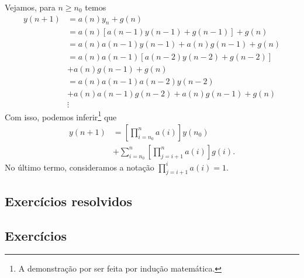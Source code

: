 Vejamos, para $n\geq n_0$ temos
\begin{align*}
  y(n+1) &= a(n)y_n + g(n) \\
         &= a(n)\left[a(n-1)y(n-1)+g(n-1)\right] + g(n) \\
         &= a(n)a(n-1)y(n-1)+a(n)g(n-1) + g(n) \\
         &= a(n)a(n-1)\left[a(n-2)y(n-2)+g(n-2)\right] \\
         &+ a(n)g(n-1) + g(n) \\
         &= a(n)a(n-1)a(n-2)y(n-2) \\
         &+ a(n)a(n-1)g(n-2) + a(n)g(n-1) + g(n) \\
         &\vdots
\end{align*}
Com isso, podemos inferir\footnote{A demonstração por ser feita por indução matemática.} que
\begin{align}
  y(n+1) &= \left[\prod_{i=n_0}^n a(i)\right]y(n_0) \\
         &+ \sum_{i=n_0}^n\left[\prod_{j=i+1}^{n} a(i)\right]g(i).
\end{align}
No último termo, consideramos a notação $\prod_{j=i+1}^i a(i) = 1$.


\emconstrucao

\subsection*{Exercícios resolvidos}

\emconstrucao

\subsection*{Exercícios}

\emconstrucao